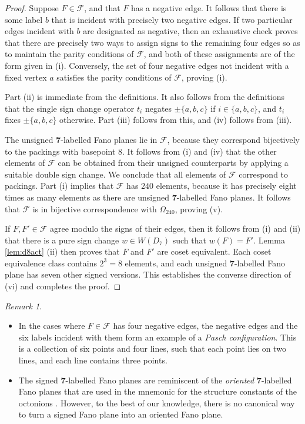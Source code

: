\documentclass{amsart}
\theoremstyle{plain}
\theoremstyle{definition}
\theoremstyle{remark}
\newtheorem{rmk}[theorem]{Remark}
\numberwithin{equation}{section}
\newcommand{\calf}{\mathcal{F}}
\newcommand{\seven}{{\mathbf 7}}
\newcommand{\qpx}{\Omega_{240}}
\begin{document}
\begin{proof}
Suppose $F \in \calf$, and that $F$ has a negative edge. It follows that there is some label $b$ that is incident
with precisely two negative edges. If two particular edges incident with $b$ are designated as negative, then an
exhaustive check proves that there are precisely two ways to assign signs to the remaining four edges so as to maintain
the parity conditions of $\calf$, and both of these assignments are of the form given in (i). Conversely, the set of
four negative edges not incident with a fixed vertex $a$ satisfies the parity conditions of $\calf$, proving (i).

Part (ii) is immediate from the definitions. It also follows from the definitions that the single sign change operator 
$t_i$ negates $\pm \{a, b, c\}$ if $i \in \{a, b, c\}$, and $t_i$ fixes $\pm \{a, b, c\}$ otherwise. Part (iii) follows 
from this, and (iv) follows from (iii).

The unsigned $\seven$-labelled Fano planes lie in $\calf$, because they correspond bijectively to the packings with
basepoint $8$. It follows from (i) and (iv) that the other elements of $\calf$ can be obtained from their unsigned
counterparts by applying a suitable double sign change. We conclude that all elements of $\calf$ correspond to packings.
Part (i) implies that $\calf$ has $240$ elements, because it has precisely eight times as many elements as there are 
unsigned $\seven$-labelled Fano planes. It follows that $\calf$ is in bijective correspondence with $\qpx$, proving
(v).

If $F, F' \in \calf$ agree modulo the signs of their edges, then it follows from (i) and (ii) that there is a pure sign
change $w \in W(D_7)$ such that $w(F) = F'$. Lemma \ref{lem:d8act} (ii) then proves that $F$ and $F'$ are coset equivalent.
Each coset equivalence class contains $2^3 = 8$ elements, and each unsigned $\seven$-labelled Fano plane has seven other
signed versions. This establishes the converse direction of (vi) and completes the proof.
\end{proof}

\begin{rmk}\label{rmk:d7sign}
\begin{itemize}
\item[(i)]{In the cases where $F \in \calf$ has four negative edges, the negative edges and the six labels incident with them
form an example of a {\it Pasch configuration}. This is a collection of six points and four lines, such that each point lies 
on two lines, and each line contains three points.}
\item[(ii)]{The signed $\seven$-labelled Fano planes are reminiscent of the {\it oriented} $\seven$-labelled Fano planes that
are used in the mnemonic for the structure constants of the octonions \cite[\S2.1]{baez02}. However, to the best of our
knowledge, there is no canonical way to turn a signed Fano plane into an oriented Fano plane.}
\end{itemize}
\end{rmk}
\end{document}
